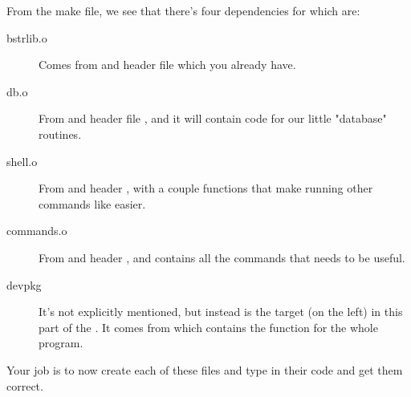From the make file, we see that there's four dependencies for 
which are:

\begin{description}
\item[bstrlib.o] Comes from  and header file  which
    you already have.
\item[db.o] From  and header file , and it
    will contain code for our little "database" routines.
\item[shell.o] From  and header , with a couple
    functions that make running other commands like  easier.
\item[commands.o] From  and header , and
    contains all the commands that  needs to be useful.
\item[devpkg] It's not explicitly mentioned, but instead is the target
    (on the left) in this part of the . It comes from
     which contains the  function for the whole
    program.
\end{description}

Your job is to now create each of these files and type in their code
and get them correct.

